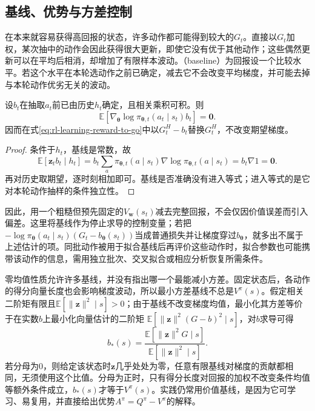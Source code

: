 \subsection{基线、优势与方差控制}
\label{sec:rl-learning-baseline}

在本来就容易获得高回报的状态，许多动作都可能得到较大的$G_t$。直接以$G_t$加权，某次抽中的动作会因此获得很大更新，即使它没有优于其他动作；这些偶然更新可以在平均后相消，却增加了有限样本波动。（baseline）为回报设一个比较水平。若这个水平在本轮选动作之前已确定，减去它不会改变平均梯度，并可能去掉与本轮动作优劣无关的波动。

\begin{theorem}[动作抽样前基线的零均值性质]
  \label{thm:rl-learning-baseline}
  设$b_t$在抽取$a_t$前已由历史$h_t$确定，且相关乘积可积。则
  \[
    \mathbb E[\nabla_{\bm\theta}
       \log\pi_{\bm\theta,t}(a_t\mid s_t)b_t]=\bm0.
  \]
  因而在式\eqref{eq:rl-learning-reward-to-go}中以$G_t^H-b_t$替换$G_t^H$，不改变期望梯度。
\end{theorem}
\begin{proof}
  条件于$h_t$，基线是常数，故
  \[
    \mathbb E[\bm{z}_t b_t\mid h_t]
      =b_t\sum_a\pi_{\bm\theta,t}(a\mid s_t)
                    \nabla\log\pi_{\bm\theta,t}(a\mid s_t)
      =b_t\nabla 1=\bm0.
  \]
  再对历史取期望，逐时刻相加即可。基线是否准确没有进入等式；进入等式的是它对本轮动作抽样的条件独立性。
\end{proof}

因此，用一个粗糙但预先固定的$V_{\bm w}(s_t)$减去完整回报，不会仅因价值误差而引入偏差。这里将基线作为停止求导的控制变量；若把$-\log\pi_{\bm\theta}(a_t\mid s_t)(G_t-b_{\bm\theta}(s_t))$当成普通损失并让梯度穿过$b_{\bm\theta}$，就多出不属于上述估计的项。同批动作被用于拟合基线后再评价这些动作时，拟合参数也可能携带该动作的信息，需用独立批次、交叉拟合或相应分析恢复所需条件。

零均值性质允许许多基线，并没有指出哪一个最能减小方差。固定状态后，各动作的得分向量长度也会影响梯度波动，所以最小方差基线不总是$V^\pi(s)$。假定相关二阶矩有限且$\mathbb E[\lVert\bm z\rVert^2\mid s]>0$；由于基线不改变梯度均值，最小化其方差等价于在实数$b$上最小化向量估计的二阶矩
$\mathbb E[\lVert\bm z\rVert^2(G-b)^2\mid s]$，对$b$求导可得
\[
  b_*(s)=
    \frac{\mathbb E[\lVert\bm z\rVert^2G\mid s]}
         {\mathbb E[\lVert\bm z\rVert^2\mid s]}.
\]
若分母为0，则给定该状态时$\bm z$几乎处处为零，任意有限基线对梯度的贡献都相同，无须使用这个比值。分母为正时，只有得分长度对回报的加权不改变条件均值等额外条件成立，$b_*(s)$才等于$V^\pi(s)$。实践仍常用价值基线，是因为它可学习、易复用，并直接给出优势$A^\pi=Q^\pi-V^\pi$的解释。

